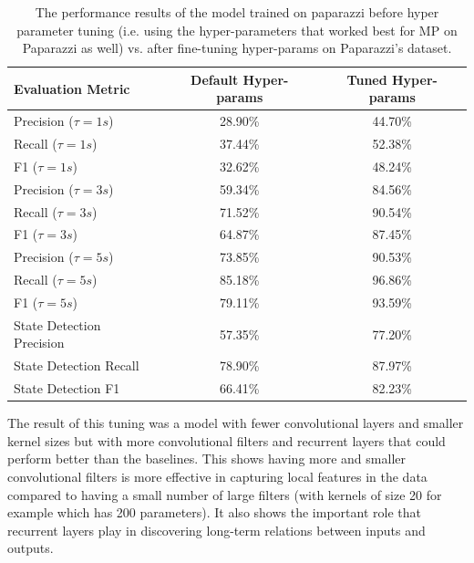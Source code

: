 \begin{table}[]
    \centering
    \begin{tabular}{lcc}
    \toprule
\textbf{Evaluation Metric} & \textbf{Default Hyper-params} & \textbf{Tuned Hyper-params} \\\midrule
Precision ($\tau=1s$)      &  28.90\%  &  44.70\% \\
Recall ($\tau=1s$)         &  37.44\%  &  52.38\% \\
F1 ($\tau=1s$)             &  32.62\%  &  48.24\% \\ \midrule
Precision ($\tau=3s$)      &  59.34\%  &  84.56\% \\
Recall ($\tau=3s$)         &  71.52\%  &  90.54\% \\
F1 ($\tau=3s$)             &  64.87\%  &  87.45\% \\ \midrule
Precision ($\tau=5s$)      &  73.85\%  &  90.53\% \\
Recall ($\tau=5s$)         &  85.18\%  &  96.86\% \\
F1 ($\tau=5s$)             &  79.11\%  &  93.59\% \\ \midrule
State Detection Precision  &  57.35\%  &  77.20\% \\
State Detection Recall     &  78.90\%  &  87.97\% \\
State Detection F1         &  66.41\%  &  82.23\% \\
\bottomrule
    \end{tabular}
    \caption{The performance results of the model trained on paparazzi before hyper parameter tuning (i.e. using the hyper-parameters that worked best for MP on Paparazzi as well) vs. after fine-tuning hyper-params on Paparazzi's dataset.}
    \label{tab:results_no_tuning}
\end{table}

\begin{rqanswer}
The result of this tuning was a model with fewer convolutional layers and smaller kernel sizes but with more convolutional filters and recurrent layers that could perform better than the baselines. This shows having more and smaller convolutional filters is more effective in capturing local features in the data compared to having a small number of large filters (with kernels of size 20 for example which has 200 parameters). It also shows the important role that recurrent layers play in discovering long-term relations between inputs and outputs. 
\end{rqanswer}


